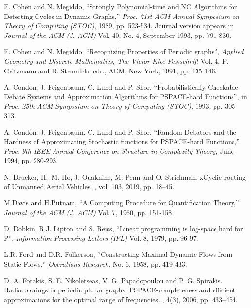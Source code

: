 \begin{thebibliography}{HMRR93}
E. Cohen and  N. Megiddo,
``Strongly Polynomial-time and NC Algorithms for 
Detecting Cycles in Dynamic Graphs,''
{\em Proc. 21st ACM Annual Symposium on Theory of Computing (STOC)}, 
1989, pp. 523-534. 
Journal version  appears in {\em Journal of the ACM (J. ACM)} Vol. 40,
No. 4, September 1993, pp. 791-830.




E. Cohen and N. Megiddo,
``Recognizing Properties of Periodic graphs'',
{\em Applied Geometry and Discrete Mathematics, The Victor Klee Festschrift}
Vol. 4, P. Gritzmann and B. Strumfels, eds., ACM, New York, 1991, pp. 135-146.




 A. Condon, J. Feigenbaum, C. Lund and P. Shor,
``Probabilistically Checkable Debate Systems and Approximation Algorithms
for {PSPACE}-hard Functions'', in  
{\em Proc.  25th ACM Symposium on Theory of Computing (STOC)}, 
1993, pp. 305-313.


 A. Condon, J. Feigenbaum, C. Lund and P. Shor,
``Random Debators and the Hardness of Approximating
Stochastic functions for {PSPACE}-hard Functions,'' 
{\em Proc. 9th IEEE Annual Conference on Structure in Complexity Theory}, 
June 1994, pp. 280-293. 

\newblock N. Drucker, H.~M. Ho, J. Ouaknine, M. Penn and O. Strichman.
\newblock xCyclic-routing of Unmanned Aerial Vehicles.
,
vol. 103, 2019, pp. 18--45.

M.Davis and H.Putnam, 
``A Computing Procedure for Quantification Theory,''
{\em Journal of the ACM (J. ACM)} 
Vol. 7, 1960, pp. 151-158.




D. Dobkin, R.J. Lipton and S. Reiss,
``Linear programming is log-space hard for P'',
{\em Information Processing Letters (IPL)} 
Vol. 8, 1979, pp. 96-97.


L.R. Ford and D.R. Fulkerson,
``Constructing Maximal Dynamic Flows from Static Flows,''
{\em Operations Research,}
No. 6, 1958, pp. 419-433.


D. A. Fotakis, S. E. Nikoletseas, V. G. Papadopoulou and P. G. Spirakis.
\newblock Radiocolorings in periodic planar graphs: {PSPACE}-completeness 
and efficient approximations for the optimal range of frequencies.
, 4(3), 2006, pp. 433--454.



\end{thebibliography}
